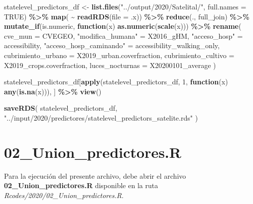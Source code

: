 \documentclass[
  12pt,
]{book}
\newenvironment{Shaded}{\begin{snugshade}}{\end{snugshade}}
\newcommand{\AttributeTok}[1]{\textcolor[rgb]{0.13,0.29,0.53}{#1}}
\newcommand{\ConstantTok}[1]{\textcolor[rgb]{0.56,0.35,0.01}{#1}}
\newcommand{\ControlFlowTok}[1]{\textcolor[rgb]{0.13,0.29,0.53}{\textbf{#1}}}
\newcommand{\DecValTok}[1]{\textcolor[rgb]{0.00,0.00,0.81}{#1}}
\newcommand{\FunctionTok}[1]{\textcolor[rgb]{0.13,0.29,0.53}{\textbf{#1}}}
\newcommand{\NormalTok}[1]{#1}
\newcommand{\OtherTok}[1]{\textcolor[rgb]{0.56,0.35,0.01}{#1}}
\newcommand{\SpecialCharTok}[1]{\textcolor[rgb]{0.81,0.36,0.00}{\textbf{#1}}}
\newcommand{\StringTok}[1]{\textcolor[rgb]{0.31,0.60,0.02}{#1}}
\begin{document}
\begin{Shaded}
\begin{Highlighting}[]
\NormalTok{statelevel\_predictors\_df }\OtherTok{\textless{}{-}}
    \FunctionTok{list.files}\NormalTok{(}\StringTok{"../output/2020/Satelital/"}\NormalTok{, }\AttributeTok{full.names =} \ConstantTok{TRUE}\NormalTok{) }\SpecialCharTok{\%\textgreater{}\%}
  \FunctionTok{map}\NormalTok{( }\SpecialCharTok{\textasciitilde{}} \FunctionTok{readRDS}\NormalTok{(}\AttributeTok{file =}\NormalTok{ .x)) }\SpecialCharTok{\%\textgreater{}\%}
  \FunctionTok{reduce}\NormalTok{(., full\_join) }\SpecialCharTok{\%\textgreater{}\%}
  \FunctionTok{mutate\_if}\NormalTok{(is.numeric, }\ControlFlowTok{function}\NormalTok{(x)}
    \FunctionTok{as.numeric}\NormalTok{(}\FunctionTok{scale}\NormalTok{(x))) }\SpecialCharTok{\%\textgreater{}\%}
  \FunctionTok{rename}\NormalTok{(}
    \AttributeTok{cve\_mun =}\NormalTok{ CVEGEO,}
    \StringTok{"modifica\_humana"} \OtherTok{=}\NormalTok{ X2016\_gHM,}
    \StringTok{"acceso\_hosp"} \OtherTok{=}\NormalTok{ accessibility,}
    \StringTok{"acceso\_hosp\_caminando"} \OtherTok{=}\NormalTok{ accessibility\_walking\_only,}
    \AttributeTok{cubrimiento\_urbano =}\NormalTok{ X2019\_urban.coverfraction,}
    \AttributeTok{cubrimiento\_cultivo =}\NormalTok{ X2019\_crops.coverfraction,}
    \AttributeTok{luces\_nocturnas =}\NormalTok{ X20200101\_average}
\NormalTok{  )}

\NormalTok{statelevel\_predictors\_df[}\FunctionTok{apply}\NormalTok{(statelevel\_predictors\_df, }\DecValTok{1}\NormalTok{, }\ControlFlowTok{function}\NormalTok{(x)}
  \FunctionTok{any}\NormalTok{(}\FunctionTok{is.na}\NormalTok{(x))), ] }\SpecialCharTok{\%\textgreater{}\%} \FunctionTok{view}\NormalTok{()}

\FunctionTok{saveRDS}\NormalTok{(}
\NormalTok{  statelevel\_predictors\_df,}
  \StringTok{"../input/2020/predictores/statelevel\_predictors\_satelite.rds"}
\NormalTok{)}
\end{Highlighting}
\end{Shaded}

\hypertarget{union_predictores.r}{%
\chapter*{02\_Union\_predictores.R}\label{union_predictores.r}}

Para la ejecución del presente archivo, debe abrir el archivo \textbf{02\_Union\_predictores.R} disponible en la ruta \emph{Rcodes/2020/02\_Union\_predictores.R}.
\end{document}
